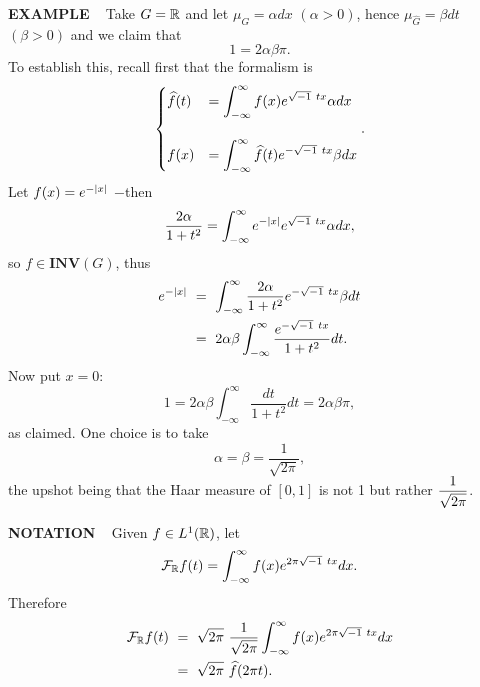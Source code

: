 \begin{x}{\small\bf EXAMPLE} \ %
Take $G = \mathbb{R}$ and let $\mu_G = \alpha dx$ $(\alpha > 0)$, hence $\mu_{\widehat{G}} = \beta dt $ $(\beta > 0)$ 
and we claim that
\[
1 = 2\alpha \beta \pi.
\]
To establish this, recall first that the formalism is
\[
\begin{cases}
\widehat{f}(t) 	&= \ds\int_{-\infty}^\infty f(x) e^{\sqrt{-1}\  tx} \alpha dx \\	
\\
f(x) 	&= \ds\int_{-\infty}^\infty \widehat{f}(t) e^{-\sqrt{-1} \ tx} \beta dx 
\end{cases}
.
\]
Let $f(x) = e^{-\left\vert x\right\vert}$ $-$then
\[
\frac{2\alpha}{1 + t^2} = \int_{-\infty}^\infty e^{-\left\vert x\right\vert} e^{\sqrt{-1}\  tx} \alpha dx,
\]
so $f \in \mathbf{INV}(G)$, thus
\[
\begin{aligned}
e^{-\abs{x}} \ 
&=\  \int_{-\infty}^\infty \frac{2\alpha}{1 + t^2} e^{-\sqrt{-1} \ tx} \beta dt \\
&= \  2\alpha \beta \int_{-\infty}^\infty \frac{e^{-\sqrt{-1}\  tx }}{1 + t^2}dt.
\end{aligned}
\]
Now put $x = 0:$
\[
1 = 2\alpha \beta \int_{-\infty}^\infty \frac{dt}{1 + t^2}dt = 2\alpha \beta  \pi,
\]
as claimed.  One choice is to take
\[
\alpha = \beta = \frac{1}{\sqrt{2\pi}},
\]
the upshot being that the Haar measure of $[0,1]$ is not 1 but rather $\displaystyle\frac{1}{\sqrt{2\pi}}$.
\end{x}

\vspace{0.1cm}

\begin{x}{\small\bf NOTATION} \ %
Given $f \in L^1(\mathbb{R})$, let
\[
\mathcal{F}_{\mathbb{R}} f(t) = \int_{-\infty}^\infty f(x) e^{2\pi \sqrt{-1}\   tx} dx.
\]
Therefore
\begin{align*}
\sF_\R f(t) \ 
&=\  \sqrt{2\pi}\   \frac{1}{\sqrt{2\pi}} \int_{-\infty}^\infty f(x) e^{2\pi \sqrt{-1}\   tx} dx \\
&=\   \sqrt{2\pi}\   \widehat{f}(2 \pi t).
\end{align*}
\end{x}

\vspace{0.1cm}

